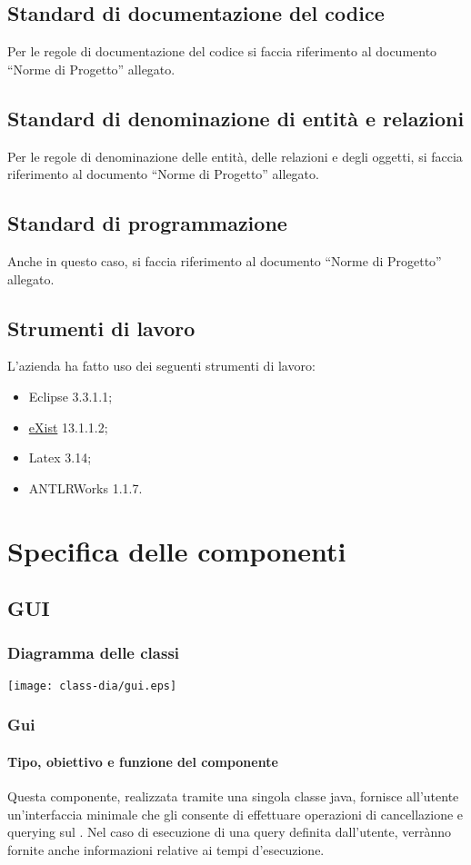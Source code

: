 \section{Standard di documentazione del codice}
Per le regole di documentazione del codice si faccia riferimento al documento ``Norme di Progetto'' allegato.
\section{Standard di denominazione di entit\`a e relazioni}
Per le regole di denominazione delle entit\`a, delle relazioni e degli oggetti, si faccia riferimento al documento ``Norme di Progetto'' allegato.
\section{Standard di programmazione}
Anche in questo caso, si faccia riferimento al documento ``Norme di Progetto'' allegato.
\section{Strumenti di lavoro}
L'azienda ha fatto uso dei seguenti strumenti di lavoro:
\begin{itemize}
\item Eclipse 3.3.1.1;
\item \underline{eXist} 13.1.1.2; 
\item Latex 3.14;
\item ANTLRWorks 1.1.7.
\end{itemize}
\chapter{Specifica delle componenti}
\section{GUI}
\subsection{Diagramma delle classi}
\begin{center}
\texttt{[image: class-dia/gui.eps]}
\end{center}
\subsection{Gui}
\subsubsection{Tipo, obiettivo e funzione del componente}
Questa componente, realizzata tramite una singola classe java, fornisce all'utente un'interfaccia minimale che gli consente di effettuare operazioni di cancellazione e querying sul \rp. Nel caso di esecuzione di una query definita dall'utente, verr\`anno fornite anche informazioni relative ai tempi d'esecuzione.
